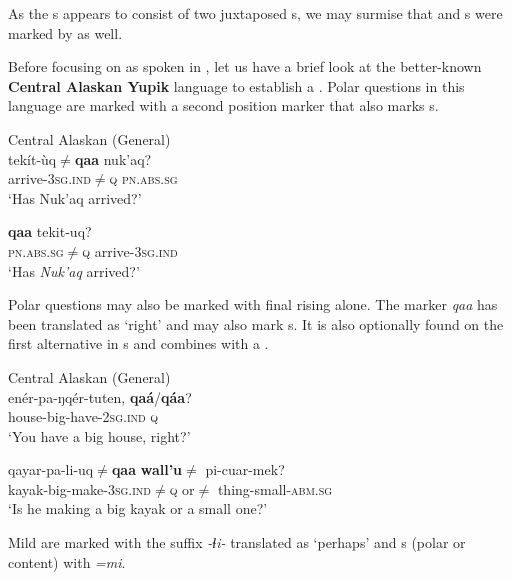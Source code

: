 As the s appears to consist of two juxtaposed s, we may surmise that  and s were marked by  as well.

Before focusing on  as spoken in , let us have a brief look at the better-known \textbf{Central Alaskan Yupik} language to establish a . Polar questions in this language are marked with a second position marker that also marks s.

\ea%
    \label{ex:eska:6}
    Central Alaskan  (General)\\
    \ea
    \gll tekít-ùq${\neq}$\textbf{{qaa}} nuk’aq?\\
    arrive-3\textsc{sg.ind}${\neq}$\textsc{q}  \textsc{pn.abs.sg}\\
    \glt ‘Has Nuk’aq arrived?’
    
    \ex
    \textbf{{qaa}} tekit-uq?\\
    \textsc{pn.abs.sg}${\neq}$\textsc{q}    arrive-3\textsc{sg.ind}\\
    \glt ‘Has \textit{Nuk’aq} arrived?’ \citep[168]{Miyaoka2012}
    \z
    \z

Polar questions may also be marked with final rising  alone. The marker \textit{qaa} has been translated as ‘right’ and may also mark s. It is also optionally found on the first alternative in s and combines with a .

\ea%
    \label{ex:eska:7}
    Central Alaskan  (General)\\
    \ea
    \gll enér-pa-ŋqér-tuten, \textbf{{qaá}}/\textbf{{qáa}}?\\
    house-big-have-2\textsc{sg.ind}  \textsc{q}\\
    \glt ‘You have a big house, right?’
    
    \ex
    \gll qayar-pa-li-uq${\neq}$\textbf{qaa} \textbf{wall’u}${\neq}$  pi-cuar-mek?\\
    kayak-big-make-3\textsc{sg.ind}${\neq}$\textsc{q}  or${\neq}$    thing-small-\textsc{abm.sg}\\
    \glt ‘Is he making a big kayak or a small one?’ \citep[170]{Miyaoka2012}
    \z
    \z

Mild  are marked with the suffix \textit{-ɬi-} translated as ‘perhaps’ and s (polar or content) with \textit{=mi}.

